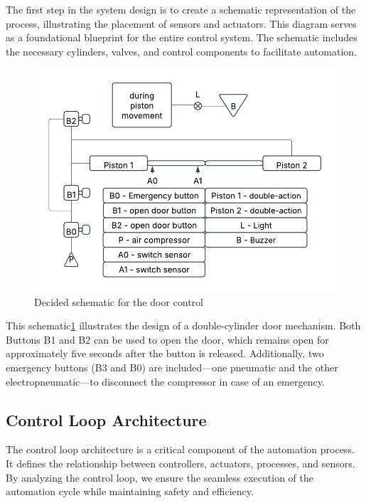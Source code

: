 The first step in the system design is to create a schematic representation of the process, 
illustrating the placement of sensors and actuators. This diagram serves as a foundational blueprint 
for the entire control system. The schematic includes the necessary cylinders, valves, and control 
components to facilitate automation.

\begin{figure}[H]
    \includegraphics[width=16cm]{Images/schematic.png}
    \centering
    \caption{Decided schematic for the door control}
    \label{fig:schematic}
\end{figure}

This schematic\ref{fig:schematic} illustrates the design of a double-cylinder door mechanism. Both Buttons B1 and B2 
can be used to open the door, which remains open for approximately five seconds after the button is 
released. Additionally, two emergency buttons (B3 and B0) are included—one pneumatic and the other 
electropneumatic—to disconnect the compressor in case of an emergency.

\subsection{Control Loop Architecture} \label{sec:Control_Loop_Architecture}

The control loop architecture is a critical component of the automation process. It 
defines the relationship between controllers, actuators, processes, and sensors. By 
analyzing the control loop, we ensure the seamless execution of the automation cycle while maintaining safety and efficiency.

